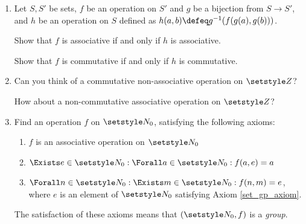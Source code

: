 \begin{enumerate}
 \item \label{q_functions_op_biject}
  Let \(S, S'\) be sets, \(f\) be an operation on \(S'\) and
  \(g\) be a bijection from \(S \to S'\), and \(h\) be an operation on \(S\)
  defined as \(h(a, b) \defeq g^{-1}(f(g(a), g(b)))\).

  Show that \(f\) is associative if and only if \(h\) is associative.

  Show that \(f\) is commutative if and only if \(h\) is commutative.
 \item
  Can you think of a commutative non-associative operation on \(\Integers\)?

  How about a non-commutative associative operation on \(\Integers\)?
 \item
  Find an operation \(f\) on \(\Naturals_0\), satisfying the following axioms:
  \begin{enumerate}
   \item
    \(f\) is an associative operation on \(\Naturals_0\)
   \item \label{set_gp_axiom}
    \(\Exists e \in \Naturals_0 : \Forall a \in \Naturals_0 : f(a, e) = a\)
   \item
    \(\Forall n \in \Naturals_0 : \Exists m \in \Naturals_0 : f(n, m) = e\),
    where \(e\) is an element of \(\Naturals_0\) satisfying Axiom
    \ref{set_gp_axiom}.
  \end{enumerate}
  The satisfaction of these axioms means that \((\Naturals_0, f)\) is a
  \emph{group}.


\end{enumerate}

